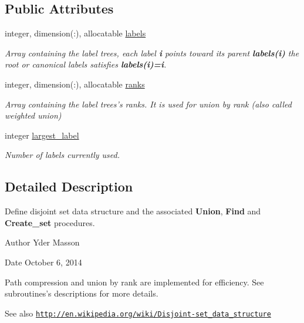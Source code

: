 \subsection*{\-Public \-Attributes}
\begin{DoxyCompactItemize}
\item 
integer, dimension(\-:), allocatable \hyperlink{classdisjoint__set_a83aa2507f2114f339d1d6db1962be0a5}{labels}
\begin{DoxyCompactList}\small\item\em \-Array containing the label trees, each label {\bfseries i} points toward its parent {\bfseries labels(i)} the root or canonical labels satisfies {\bfseries labels(i)=i}. \end{DoxyCompactList}\item 
integer, dimension(\-:), allocatable \hyperlink{classdisjoint__set_aa2cdbf9649ea65c9f319db6efcccbd2d}{ranks}
\begin{DoxyCompactList}\small\item\em \-Array containing the label trees's ranks. \-It is used for union by rank (also called weighted union) \end{DoxyCompactList}\item 
integer \hyperlink{classdisjoint__set_a2a38373e2aad581740cb09ecf192d3b1}{largest\-\_\-label}
\begin{DoxyCompactList}\small\item\em \-Number of labels currently used. \end{DoxyCompactList}\end{DoxyCompactItemize}


\subsection{\-Detailed \-Description}
\-Define disjoint set data structure and the associated {\bfseries \-Union}, {\bfseries \-Find} and {\bfseries \-Create\-\_\-set} procedures. 

\begin{DoxyAuthor}{\-Author}
\-Yder \-Masson 
\end{DoxyAuthor}
\begin{DoxyDate}{\-Date}
\-October 6, 2014
\end{DoxyDate}
\-Path compression and union by rank are implemented for efficiency. \-See subroutines's descriptions for more details. \begin{DoxySeeAlso}{\-See also}
\href{http://en.wikipedia.org/wiki/Disjoint-set_data_structure}{\tt http\-://en.\-wikipedia.\-org/wiki/\-Disjoint-\/set\-\_\-data\-\_\-structure} 
\end{DoxySeeAlso}


